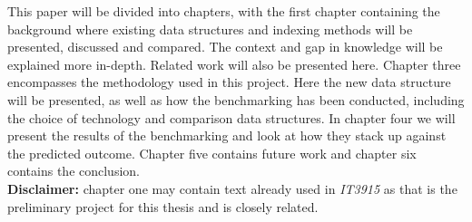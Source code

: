 This paper will be divided into chapters, with the first chapter containing the background where existing data structures and indexing methods will be presented, discussed and compared. The context and gap in knowledge will be explained more in-depth. Related work will also be presented here. Chapter three encompasses the methodology used in this project. Here the new data structure will be presented, as well as how the benchmarking has been conducted, including the choice of technology and comparison data structures. In chapter four we will present the results of the benchmarking and look at how they stack up against the predicted outcome. Chapter five contains future work and chapter six contains the conclusion.
\\

\textbf{Disclaimer:} chapter one may contain text already used in \textit{IT3915} as that is the preliminary project for this thesis and is closely related.
